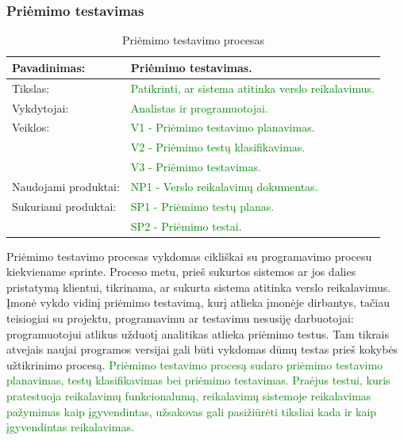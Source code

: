 \documentclass{VUMIFPSkursinis}
\begin{document}
	\subsubsection{Priėmimo testavimas}
	\begin{center}
		\begin{table}[ht]
			\caption{Priėmimo testavimo procesas}
			\begin{tabular}{ | l | l | }
				\hline
				Pavadinimas:         & Priėmimo testavimas.                                               \\ \hline
				Tikslas:             & \textcolor{green}{Patikrinti, ar sistema atitinka verslo reikalavimus.}   \\ \hline
				Vykdytojai:          & \textcolor{green}{Analistas ir programuotojai.}                           \\ \hline
				Veiklos:             & \textcolor{green}{V1 - Priėmimo testavimo planavimas.}                    \\
				                     & \textcolor{green}{V2 - Priėmimo testų klasifikavimas.}             \\
				                     & \textcolor{green}{V3 - Priėmimo testavimas.}                              \\ \hline
				Naudojami produktai: & \textcolor{green}{NP1 - Verslo reikalavimų dokumentas.}                   \\ \hline
				Sukuriami produktai: & \textcolor{green}{SP1 - Priėmimo testų planas.}                    \\
				                     & \textcolor{green}{SP2 - Priėmimo testai.}                          \\ \hline
			\end{tabular}
		\end{table}
	\end{center}
	Priėmimo testavimo procesas vykdomas cikliškai su programavimo procesu kiekviename sprinte.
	Proceso metu, prieš sukurtos sistemos ar jos dalies pristatymą klientui, tikrinama, ar sukurta sistema atitinka verslo reikalavimus.
	Įmonė vykdo vidinį priėmimo testavimą, kurį atlieka įmonėje dirbantys, tačiau teisiogiai su projektu, programavimu ar testavimu nesusiję darbuotojai: programuotojui atlikus užduotį analitikas atlieka priėmimo testus.
	Tam tikrais atvejais naujai programos versijai gali būti vykdomas dūmų testas prieš kokybės užtikrinimo procesą.
	\textcolor{green}{Priėmimo testavimo procesą sudaro priėmimo testavimo planavimas, testų klasifikavimas bei priėmimo testavimas.
	Praėjus testui, kuris pratestuoja reikalavimų funkcionalumą, reikalavimų sistemoje reikalavimas pažymimas kaip įgyvendintas, užsakovas gali pasižiūrėti tiksliai kada ir kaip įgyvendintas reikalavimas.}
\end{document}
